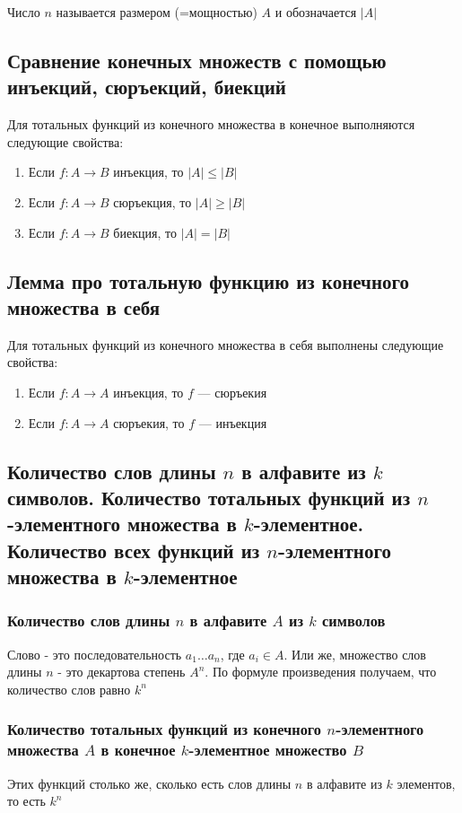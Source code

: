 \documentclass[a4paper]{article}
\begin{document}
 Число $n$ называется размером (=мощностью) $A$ и обозначается $|A|$

\subsection{Сравнение конечных множеств с помощью инъекций, сюръекций, биекций}
Для тотальных функций из конечного множества в конечное выполняются следующие свойства:
\begin{enumerate}
    \item Если $f: A\rightarrow B$ инъекция, то $|A|\leqslant|B|$
    \item Если $f: A\rightarrow B$ сюръекция, то $|A|\geqslant|B|$
    \item Если $f: A\rightarrow B$ биекция, то $|A|=|B|$
\end{enumerate}

\subsection{Лемма про тотальную функцию из конечного множества в себя}
Для тотальных функций из конечного множества в себя выполнены следующие свойства:
\begin{enumerate}
    \item Если $f: A\rightarrow A$ инъекция, то $f$ — сюръекия
    \item Если $f: A\rightarrow A$ сюръекия, то $f$ — инъекция
\end{enumerate}

\subsection{Количество слов длины $n$ в алфавите из $k$ символов. Количество тотальных функций из $n$-элементного множества в $k$-элементное. Количество всех функций из $n$-элементного множества в $k$-элементное}
\subsubsection*{Количество слов длины $n$ в алфавите $A$ из $k$ символов}
Слово - это последовательность $a_1\ldots a_n$, где $a_i\in A.$ Или же, множество слов длины $n$ - это декартова степень $A^n.$ По формуле произведения получаем, что количество слов равно $k^n$
\subsubsection*{Количество тотальных функций из конечного $n$-элементного множества $A$ в конечное $k$-элементное множество $B$}
Этих функций столько же, сколько есть слов длины $n$ в алфавите из $k$ элементов, то есть $k^n$
\end{document}
